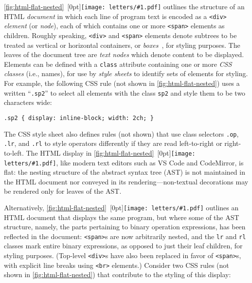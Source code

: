 \documentclass[acmsmall, screen]{acmart}
\newcommand{\vsCode}{VS Code}
\newcommand{\codeMirror}{CodeMirror}
\newcommand{\htmlTag}[1]
  {\texttt{<#1>}}
\newcommand{\htmlAttr}[1]
{\texttt{#1}}
\newcommand{\cssClass}[1]
  {\texttt{#1}}
\newcommand{\figBubble}[1]{\raisebox{-0.03in}[0pt]{\texttt{[image: letters/\#1.pdf]}}}
\newcommand{\refBubble}[1]
  {~\figBubble{#1}}
\begin{document}
\autoref{fig:html-flat-nested}\refBubble{a} outlines the structure of an HTML \emph{document} in which each line of program text is encoded as a \htmlTag{div} \emph{element} (or \emph{node}), each of which contains one or more \htmlTag{span} elements as children.
Roughly speaking, \htmlTag{div} and \htmlTag{span} elements denote subtrees to be treated as vertical or horizontal containers, or \emph{boxes}~\cite{mdnDocs}, for styling purposes.
The leaves of the document tree are \emph{text nodes} which denote content to be displayed.
Elements can be defined with a \htmlAttr{class} attribute containing one or more \emph{CSS classes} (i.e., names), for use by \emph{style sheets}
to identify sets of elements for styling.
For example, the following CSS rule (not shown in \autoref{fig:html-flat-nested}) uses a  written ``\cssClass{.sp2}'' to select all elements with the class \cssClass{sp2} and style them to be two characters wide:

{\small

\begin{Verbatim}[xleftmargin=\parindent]
.sp2 { display: inline-block; width: 2ch; }
\end{Verbatim}

}

\noindent
The CSS style sheet also defines rules (not shown) that use class selectors \cssClass{.op}, \cssClass{.lr}, and \cssClass{.rl} to style operators differently if they are read left-to-right or right-to-left.
The HTML display in \autoref{fig:html-flat-nested}\refBubble{a}, like modern text editors such as \vsCode{} and \codeMirror{}, is flat: the nesting structure of the abstract syntax tree (AST) is not maintained in the HTML document nor conveyed in its rendering---non-textual decorations may be rendered only for leaves of the AST.











Alternatively, \autoref{fig:html-flat-nested}\refBubble{b} outlines an HTML document that displays the same program, but where
some of the AST structure, namely, the parts pertaining to binary operation expressions, has been reflected in the document:
\htmlTag{span}s are now arbitrarily nested, and the \cssClass{lr} and \cssClass{rl} classes mark entire binary expressions, as opposed to just their leaf children, for styling purposes.
(Top-level \htmlTag{div}s have also been replaced in favor of \htmlTag{span}s, with explicit line breaks using \htmlTag{br} elements.)
Consider two CSS rules (not shown in \autoref{fig:html-flat-nested}) that contribute to the styling of this display:
\end{document}
